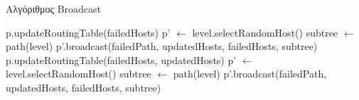 \begin{algorithm}
\caption{Αλγόριθμος Broadcast}
\label{algo:Broadcast}
\begin{algorithmic}[1]
        \State p.updateRoutingTable(failedHosts)
            \State p' $\gets$ level.selectRandomHost()
            \State subtree $\gets$ path(level)
            \State p'.broadcast(failedPath, updatedHosts, failedHosts, subtree)
        \EndFor
    \EndProcedure
    \Statex
        \State p.updateRoutingTable(failedHosts, updatedHosts)
            \State \Return
        \EndIf
            \State p' $\gets$ level.selectRandomHost()
            \State subtree $\gets$ path(level)
            \State p'.broadcast(failedPath, updatedHosts, failedHosts, subtree)
        \EndFor
    \EndProcedure
\end{algorithmic}
\end{algorithm}
